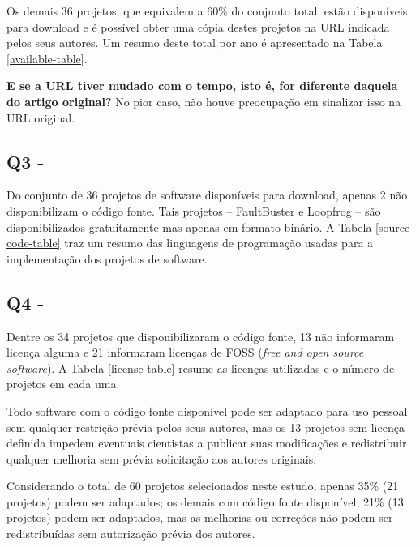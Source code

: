 Os demais 36 projetos, que equivalem a 60\% do conjunto total, estão
disponíveis para download e é possível obter uma cópia destes projetos na URL
indicada pelos seus autores. Um resumo deste total por ano é apresentado na
Tabela \ref{available-table}.


\textbf{E se a URL tiver mudado com o tempo, isto é, for diferente daquela do artigo original?}
No pior caso, não houve preocupação em sinalizar isso na URL original.




\subsection{Q3 - \EstudoUmQuestaoTres} %

Do conjunto de 36 projetos de software disponíveis para download, apenas 2 não
disponibilizam o código fonte. Tais projetos -- FaultBuster e Loopfrog --
são disponibilizados gratuitamente mas apenas em
formato binário. A Tabela \ref{source-code-table} traz um resumo das
linguagens de programação usadas para a implementação dos projetos de software.



\subsection{Q4 - \EstudoUmQuestaoQuatro} %

Dentre os 34 projetos que disponibilizaram o código fonte, 13 não informaram
licença alguma e 21 informaram licenças de FOSS ({\it free and open source
software}). A Tabela \ref{license-table} resume as licenças utilizadas e o
número de projetos em cada uma.



Todo software com o código fonte disponível pode ser adaptado para uso pessoal
sem qualquer restrição prévia pelos seus autores, mas os 13 projetos sem
licença definida impedem eventuais cientistas a publicar suas modificações e
redistribuir qualquer melhoria sem prévia solicitação aos autores originais.

Considerando o total de 60 projetos selecionados neste estudo, apenas 35\% (21
projetos) podem ser adaptados; os demais com código fonte disponível, 21\% (13 projetos) podem ser
adaptados, mas as melhorias ou correções não podem ser redistribuídas sem
autorização prévia dos autores.

